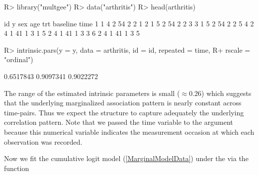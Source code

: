 \documentclass[
]{jss}
\begin{document}
\begin{CodeChunk}

\begin{CodeInput}
R> library("multgee")
R> data("arthritis")
R> head(arthritis)
\end{CodeInput}

\begin{CodeOutput}
  id y sex age trt baseline time
1  1 4   2  54   2        2    1
2  1 5   2  54   2        2    3
3  1 5   2  54   2        2    5
4  2 4   1  41   1        3    1
5  2 4   1  41   1        3    3
6  2 4   1  41   1        3    5
\end{CodeOutput}

\begin{CodeInput}
R> intrinsic.pars(y = y, data = arthritis, id = id, repeated = time,
R+                   rscale = "ordinal")
\end{CodeInput}

\begin{CodeOutput}
[1] 0.6517843 0.9097341 0.9022272
\end{CodeOutput}
\end{CodeChunk}

The range of the estimated intrinsic parameters is small
(\(\approx 0.26\)) which suggests that the underlying marginalized
association pattern is nearly constant across time-pairs. Thus we expect
the  structure to capture adequately the underlying
correlation pattern. Note that we passed the time variable to the
 argument because this numerical variable indicates the
measurement occasion at which each observation was recorded.

Now we fit the cumulative logit model (\ref{MarginalModelData}) under
the  via the function 
\end{document}

